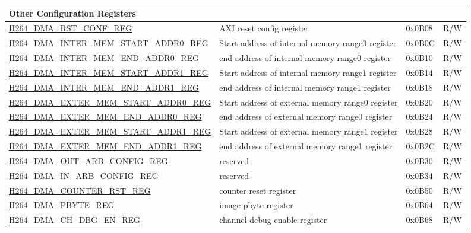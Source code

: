 \begin{longtable}{ | p{7.5cm} | p{5.7cm} | p{1.2cm} | p{1cm} | }
    \multicolumn{4}{|l|}{\textbf{Other Configuration Registers}} \\ \hline
    \hyperref[regdesc:H264DMARSTCONFREG]{H264\_DMA\_RST\_CONF\_REG} & AXI reset config register & 0x0B08 & R/W \\ \hline
    \hyperref[regdesc:H264DMAINTERMEMSTARTADDR0REG]{H264\_DMA\_INTER\_MEM\_START\_ADDR0\_REG} & Start address of internal memory range0 register & 0x0B0C & R/W \\ \hline
    \hyperref[regdesc:H264DMAINTERMEMENDADDR0REG]{H264\_DMA\_INTER\_MEM\_END\_ADDR0\_REG} & end address of internal memory range0 register & 0x0B10 & R/W \\ \hline
    \hyperref[regdesc:H264DMAINTERMEMSTARTADDR1REG]{H264\_DMA\_INTER\_MEM\_START\_ADDR1\_REG} & Start address of internal memory range1 register & 0x0B14 & R/W \\ \hline
    \hyperref[regdesc:H264DMAINTERMEMENDADDR1REG]{H264\_DMA\_INTER\_MEM\_END\_ADDR1\_REG} & end address of internal memory range1 register & 0x0B18 & R/W \\ \hline
    \hyperref[regdesc:H264DMAEXTERMEMSTARTADDR0REG]{H264\_DMA\_EXTER\_MEM\_START\_ADDR0\_REG} & Start address of external memory range0 register & 0x0B20 & R/W \\ \hline
    \hyperref[regdesc:H264DMAEXTERMEMENDADDR0REG]{H264\_DMA\_EXTER\_MEM\_END\_ADDR0\_REG} & end address of external memory range0 register & 0x0B24 & R/W \\ \hline
    \hyperref[regdesc:H264DMAEXTERMEMSTARTADDR1REG]{H264\_DMA\_EXTER\_MEM\_START\_ADDR1\_REG} & Start address of external memory range1 register & 0x0B28 & R/W \\ \hline
    \hyperref[regdesc:H264DMAEXTERMEMENDADDR1REG]{H264\_DMA\_EXTER\_MEM\_END\_ADDR1\_REG} & end address of external memory range1 register & 0x0B2C & R/W \\ \hline
    \hyperref[regdesc:H264DMAOUTARBCONFIGREG]{H264\_DMA\_OUT\_ARB\_CONFIG\_REG} & reserved & 0x0B30 & R/W \\ \hline
    \hyperref[regdesc:H264DMAINARBCONFIGREG]{H264\_DMA\_IN\_ARB\_CONFIG\_REG} & reserved & 0x0B34 & R/W \\ \hline
    \hyperref[regdesc:H264DMACOUNTERRSTREG]{H264\_DMA\_COUNTER\_RST\_REG} & counter reset register & 0x0B50 & R/W \\ \hline
    \hyperref[regdesc:H264DMAPBYTEREG]{H264\_DMA\_PBYTE\_REG} & image pbyte register & 0x0B64 & R/W \\ \hline
    \hyperref[regdesc:H264DMACHDBGENREG]{H264\_DMA\_CH\_DBG\_EN\_REG} & channel debug enable register & 0x0B68 & R/W \\ \hline

\end{longtable}
